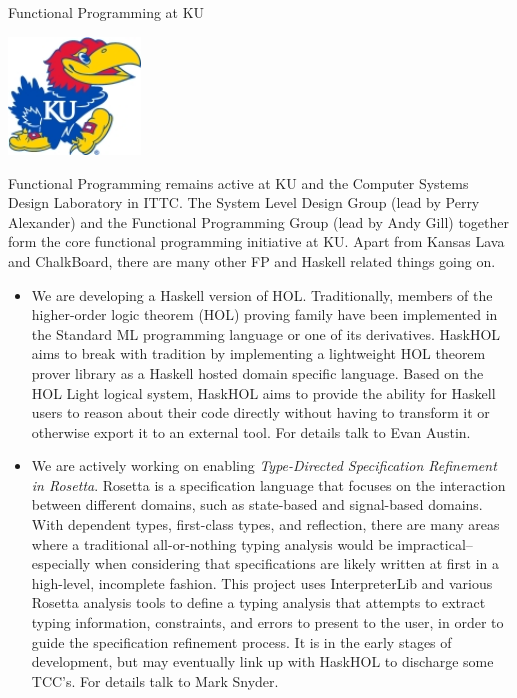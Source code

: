 \documentclass{article}
\begin{document}
\begin{hcarentry}{Functional Programming at KU}
\makeheader

\includegraphics[width=100pt]{jh2.jpg}

Functional Programming remains active at KU and 
the Computer Systems Design Laboratory in ITTC.
The System Level Design Group (lead by Perry Alexander)
and the Functional Programming Group (lead by Andy Gill)
together form the core functional programming initiative at KU.
Apart from Kansas Lava and ChalkBoard, there are many other
FP and Haskell related things going on.

\begin{itemize}
\item We are developing a Haskell version of HOL.
Traditionally, members of the higher-order logic theorem (HOL) proving family have
been implemented in the Standard ML programming language or one of its derivatives.
HaskHOL aims to break with tradition by implementing a lightweight HOL theorem prover
library as a Haskell hosted domain specific language. Based on the HOL Light logical
system, HaskHOL aims to provide the ability for Haskell users to reason about their
code directly without having to transform it or otherwise export it to an external
tool. For details talk to Evan Austin.

\item We are actively working on enabling {\em Type-Directed Specification Refinement in Rosetta\/}. Rosetta is a specification language that focuses on the interaction between different domains, such as state-based and signal-based domains.  With dependent types, first-class types, and reflection, there are many areas where a traditional all-or-nothing typing analysis would be impractical--especially when considering that specifications are likely written at first in a high-level, incomplete fashion.  This project uses InterpreterLib  and various Rosetta analysis tools to define a typing analysis that attempts to extract typing information, constraints, and errors to present to the user, in order to guide the specification refinement process.  It is in the early stages of development, but may eventually link up with HaskHOL to discharge some TCC's. For details talk to Mark Snyder.


\end{itemize}
\end{hcarentry}
\end{document}
